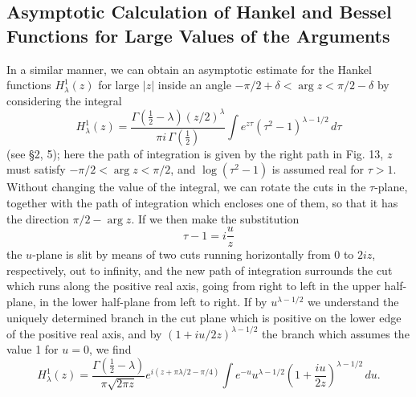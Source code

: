 \subsection{Asymptotic Calculation of Hankel and Bessel Functions for Large Values of the Arguments}
In a similar manner, we can obtain an asymptotic estimate for the Hankel functions $H_\lambda^1(z)$ for large $|z|$ inside an angle $-\pi/2+\delta<\arg z<\pi/2-\delta$ by considering the integral
\[
H_\lambda^1(z)=\frac{\Gamma(\tfrac12-\lambda)(z/2)^\lambda}{\pi i\,\Gamma(\tfrac12)}
\int e^{z\tau}(\tau^2-1)^{\lambda-1/2}\,d\tau
\]
(see \S2, 5); here the path of integration is given by the right path in Fig. 13, $z$ must satisfy $-\pi/2<\arg z<\pi/2$, and $\log(\tau^2-1)$ is assumed real for $\tau>1$. Without changing the value of the integral, we can rotate the cuts in the $\tau$-plane, together with the path of integration which encloses one of them, so that it has the direction $\pi/2-\arg z$. If we then make the substitution
\[
\tau-1=i\frac uz
\]
the $u$-plane is slit by means of two cuts running horizontally from 0 to $2iz$, respectively, out to infinity, and the new path of integration surrounds the cut which runs along the positive real axis, going from right to left in the upper half-plane, in the lower half-plane from left to right. If by $u^{\lambda-1/2}$ we understand the uniquely determined branch in the cut plane which is positive on the lower edge of the positive real axis, and by $(1+iu/2z)^{\lambda-1/2}$ the branch which assumes the value 1 for $u=0$, we find
\[
H_\lambda^1(z)=\frac{\Gamma(\tfrac12-\lambda)}{\pi\sqrt{2\pi z}}
 e^{i(z+\pi\lambda/2-\pi/4)}
\int e^{-u}u^{\lambda-1/2}\left(1+\frac{iu}{2z}\right)^{\lambda-1/2}\,du.
\]

